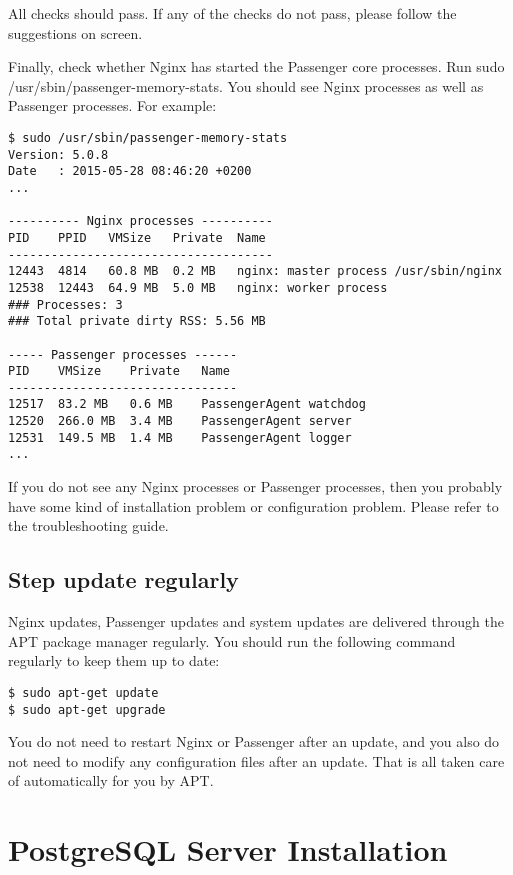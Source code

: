 \documentclass[11pt]{article}
\begin{document}
All checks should pass. If any of the checks do not pass, please follow the suggestions on screen.

Finally, check whether Nginx has started the Passenger core processes. Run sudo /usr/sbin/passenger-memory-stats. You should see Nginx processes as well as Passenger processes. For example:

\begin{verbatim}
$ sudo /usr/sbin/passenger-memory-stats
Version: 5.0.8
Date   : 2015-05-28 08:46:20 +0200
...

---------- Nginx processes ----------
PID    PPID   VMSize   Private  Name
-------------------------------------
12443  4814   60.8 MB  0.2 MB   nginx: master process /usr/sbin/nginx
12538  12443  64.9 MB  5.0 MB   nginx: worker process
### Processes: 3
### Total private dirty RSS: 5.56 MB

----- Passenger processes ------
PID    VMSize    Private   Name
--------------------------------
12517  83.2 MB   0.6 MB    PassengerAgent watchdog
12520  266.0 MB  3.4 MB    PassengerAgent server
12531  149.5 MB  1.4 MB    PassengerAgent logger
...
\end{verbatim}
If you do not see any Nginx processes or Passenger processes, then you probably have some kind of installation problem or configuration problem. Please refer to the troubleshooting guide.

\subsection{Step update regularly}
\label{sec:org21f9419}

Nginx updates, Passenger updates and system updates are delivered through the APT package manager regularly. You should run the following command regularly to keep them up to date:

\begin{verbatim}
$ sudo apt-get update
$ sudo apt-get upgrade
\end{verbatim}

You do not need to restart Nginx or Passenger after an update, and you also do not need to modify any configuration files after an update. That is all taken care of automatically for you by APT.

\section{PostgreSQL Server Installation}
\label{sec:orgfba1e14}
\end{document}
